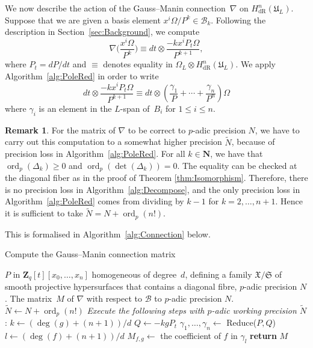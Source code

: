 \documentclass[a4paper,11pt]{article}
\numberwithin{equation}{section}
\newcommand{\NN}{\mathbf{N}} %
\newcommand{\ZZ}{\mathbf{Z}} %
\DeclareMathOperator{\ord}{ord}          %
\providecommand{\HdR}{H_{\text{dR}}}    %
\providecommand{\cB}{\mathcal{B}} %
\theoremstyle{definition}
\newtheorem{rem}[thm]{Remark}
\begin{document}
We now describe the action of the Gauss--Manin connection~$\nabla$ on 
$\HdR^n(\mathfrak{U}_L)$.  Suppose that we are given a basis element 
$x^i \Omega / P^k \in \cB_k$.  Following the description in Section~\ref{sec:Background}, 
we compute
\begin{equation} \label{eqn:nabla}
\nabla \biggl(\frac{x^i \Omega}{P^k}\biggr) \equiv 
dt \otimes \frac{- k x^i P_t \Omega}{P^{k+1}},
\end{equation}
where $P_t = dP/dt$ and $\equiv$ denotes equality in 
$\Omega_{L} \otimes \HdR^n(\mathfrak{U}_L)$. We apply 
Algorithm~\ref{alg:PoleRed} in order to write
\begin{equation}
dt \otimes \frac{- k x^i P_t \Omega}{P^{k+1}} \equiv 
dt \otimes \left( \frac{\gamma_{1}}{P} + \dotsb + \frac{\gamma_n}{P^n} \right) \Omega
\end{equation}
where $\gamma_i$ is an element in the $L$-span of~$B_i$ for $1 \leq i \leq n$. 

\begin{rem}
For the matrix of $\nabla$ to be correct to $p$-adic precision $N$, we have to 
carry out this computation to a somewhat higher precision $\tilde{N}$, because of 
precision loss in Algorithm~\ref{alg:PoleRed}. 
For all $k \in \NN$, we have that $\ord_p(\Delta_k) \geq 0$ and $\ord_p(\det(\Delta_k))=0$. 
The equality can be checked at the diagonal fiber as in the proof of 
Theorem \ref{thm:Isomorphism}. Therefore, there is no precision loss 
in Algorithm~\ref{alg:Decompose}, and the only precision loss in Algorithm~\ref{alg:PoleRed} 
comes from dividing by $k-1$ for $k=2,\ldots,n+1$. Hence it is sufficient to take 
$\tilde{N}=N + \ord_p(n!)$.
\end{rem}

This is formalised in Algorithm~\ref{alg:Connection} below.

\begin{algorithm}
\caption{Compute the Gauss--Manin connection matrix}
\label{alg:Connection}
\begin{algorithmic}
\Require $P$ in $\ZZ_q[t][x_0, \dotsc, x_n]$ homogeneous of degree~$d$, 
         defining a family $\mathfrak{X}/\mathfrak{S}$ of smooth projective 
         hypersurfaces that contains a diagonal fibre, $p$-adic precision $N$.
\Ensure  The matrix~$M$ of $\nabla$ with respect to $\cB$ to $p$-adic precision $N$.
\State $\tilde{N} \gets N + \ord_p(n!)$
\State \textit{Execute the following steps with $p$-adic working precision $\tilde{N}$}:
\State $k \gets  (\deg(g)+(n+1))/d$
\State $Q \gets  - k g P_t$ 
\State $\gamma_{1}, \dotsc, \gamma_n \gets$
      {\sc Reduce($P,Q$)} 
\State $l \gets (\deg(f)+(n+1))/d$
\State $M_{f,g} \gets$ the coefficient of $f$ in $\gamma_l$
\EndFor
\EndFor
\textbf{return} $M$
\EndProcedure
\end{algorithmic}
\end{algorithm}
\end{document}
